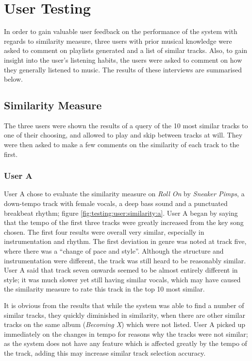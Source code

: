 \section{User Testing}
\label{text:testing:user}
In order to gain valuable user feedback on the performance of the system with regards to similarity measure, three users with prior musical knowledge were asked to comment on playlists generated and a list of similar tracks. Also, to gain insight into the user's listening habits, the users were asked to comment on how they generally listened to music. The results of these interviews are summarised below.
\subsection{Similarity Measure}
The three users were shown the results of a query of the 10 most similar tracks to one of their choosing, and allowed to play and skip between tracks at will. They were then asked to make a few comments on the similarity of each track to the first.
\subsubsection{User A}
User A chose to evaluate the similarity measure on \emph{Roll On} by \emph{Sneaker Pimps}, a down-tempo track with female vocals, a deep bass sound and a punctuated breakbeat rhythm; figure \ref{fig:testing:user:similarity:a}. User A began by saying that the tempo of the first three tracks were greatly increased from the key song chosen. The first four results were overall very similar, especially in instrumentation and rhythm. The first deviation in genre was noted at track five, where there was a ``change of pace and style''. Although the structure and instrumentation were different, the track was still heard to be reasonably similar. User A said that track seven onwards seemed to be almost entirely different in style; it was much slower yet still having similar vocals, which may have caused the similarity measure to rate this track in the top 10 most similar.


It is obvious from the results that while the system was able to find a number of similar tracks, they quickly diminished in similarity, when there are other similar tracks on the same album (\emph{Becoming X}) which were not listed. User A picked up immediately on the changes in tempo for reasons why the tracks were not similar; as the system does not have any feature which is affected greatly by the tempo of the track, adding this may increase similar track selection accuracy.
